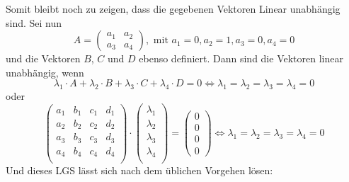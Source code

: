 \documentclass{scrreprt}
\begin{document}
\begin{enumerate}[(a)]
\begin{enumerate}[(i)]
    Somit bleibt noch zu zeigen, dass die gegebenen Vektoren Linear unabhängig
    sind.
    Sei nun
    \[
      A = \begin{pmatrix}
        a_{1} & a_{2} \\
        a_{3} & a_{4}
      \end{pmatrix}, \text{ mit } a_1 = 0, a_2 = 1, a_3 = 0, a_4 = 0
    \]
    und die Vektoren $B$, $C$ und $D$ ebenso definiert.
    Dann sind die Vektoren linear unabhängig, wenn
    \[
      \lambda_1 \cdot A + \lambda_2 \cdot B + \lambda_3 \cdot C + \lambda_4 \cdot D = 0
      \iff \lambda_1 = \lambda_2 = \lambda_3 = \lambda_4 = 0
    \]
    oder
    \[
      \begin{pmatrix}
        a_1 & b_1 & c_1 & d_1 \\
        a_2 & b_2 & c_2 & d_2 \\
        a_3 & b_3 & c_3 & d_3 \\
        a_4 & b_4 & c_4 & d_4 \\
      \end{pmatrix} \cdot \begin{pmatrix}
        \lambda_1 \\
        \lambda_2 \\
        \lambda_3 \\
        \lambda_4 \\
      \end{pmatrix} = \begin{pmatrix} 0 \\ 0 \\ 0 \\ 0 \end{pmatrix}
      \iff \lambda_1 = \lambda_2 = \lambda_3 = \lambda_4 = 0
    \]
    Und dieses LGS lässt sich nach dem üblichen Vorgehen lösen:
\end{enumerate}
\end{enumerate}
\end{document}
